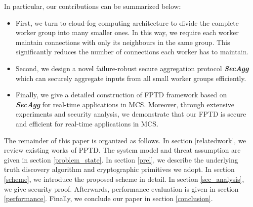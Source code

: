 \documentclass[conference,a4paper]{IEEEtran}
\def\textbi#1{\textbf{\em #1}}
\begin{document}



In particular, our contributions can be summarized below:
\begin{itemize}
  \item First, we turn to cloud-fog computing architecture to divide the complete worker group into many smaller ones. In this way, we require each worker maintain connections with only its neighbours in the same group. This significantly reduces the number of connections each worker has to maintain.
  \item Second, we design a novel failure-robust secure aggregation protocol \textbi{SecAgg} which can securely aggregate inputs from all small worker groups efficiently.
  \item Finally, we give a detailed construction of FPTD framework based on \textbi{SecAgg} for real-time applications in MCS. Moreover, through extensive experiments and security analysis, we demonstrate that our FPTD is secure and efficient for real-time applications in MCS.
\end{itemize}

The remainder of this paper is organized as follows. In section \ref{relatedwork}, we review existing works of PPTD. The system model and threat assumption are given in section \ref{problem_state}. In section \ref{prel}, we describe the underlying truth discovery algorithm and cryptographic primitives we adopt. In section \ref{scheme}, we introduce the proposed scheme in detail. In section \ref{sec_analysis}, we give security proof. Afterwards, performance evaluation is given in section \ref{performance}. Finally, we conclude our paper in section \ref{conclusion}.
\end{document}
